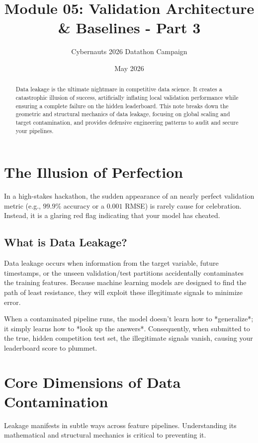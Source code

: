 \documentclass{article}
\title{Module 05: Validation Architecture \& Baselines - Part 3}
\author{Cybernauts 2026 Datathon Campaign}
\date{May 2026}
\begin{document}
\maketitle

\begin{abstract}
Data leakage is the ultimate nightmare in competitive data science. It creates a catastrophic illusion of success, artificially inflating local validation performance while ensuring a complete failure on the hidden leaderboard. This note breaks down the geometric and structural mechanics of data leakage, focusing on global scaling and target contamination, and provides defensive engineering patterns to audit and secure your pipelines.
\end{abstract}

\tableofcontents
\newpage

\section{The Illusion of Perfection}
In a high-stakes hackathon, the sudden appearance of an nearly perfect validation metric (e.g., $99.9\%$ accuracy or a $0.001$ RMSE) is rarely cause for celebration. Instead, it is a glaring red flag indicating that your model has cheated.

\subsection{What is Data Leakage?}
Data leakage occurs when information from the target variable, future timestamps, or the unseen validation/test partitions accidentally contaminates the training features. Because machine learning models are designed to find the path of least resistance, they will exploit these illegitimate signals to minimize error.

When a contaminated pipeline runs, the model doesn't learn how to *generalize*; it simply learns how to *look up the answers*. Consequently, when submitted to the true, hidden competition test set, the illegitimate signals vanish, causing your leaderboard score to plummet.

\section{Core Dimensions of Data Contamination}
Leakage manifests in subtle ways across feature pipelines. Understanding its mathematical and structural mechanics is critical to preventing it.
\end{document}
